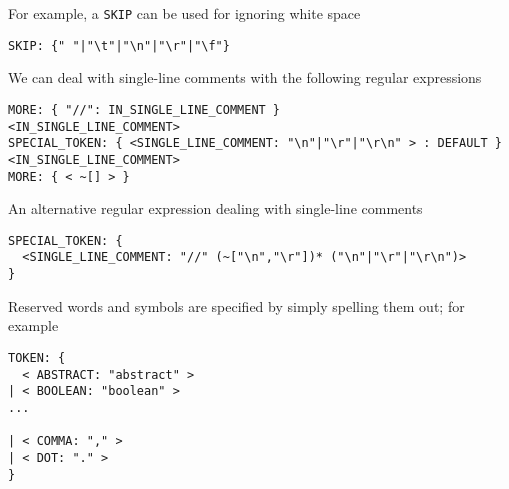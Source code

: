 \documentclass[8pt,a4paper,compress]{beamer}
\begin{document}
\begin{frame}[fragile]
\pause

For example, a \lstinline{SKIP} can be used for ignoring white space
\begin{lstlisting}[language={}]
SKIP: {" "|"\t"|"\n"|"\r"|"\f"}
\end{lstlisting}

\pause
\bigskip

We can deal with single-line comments with the following regular expressions

\begin{lstlisting}
MORE: { "//": IN_SINGLE_LINE_COMMENT }
<IN_SINGLE_LINE_COMMENT>
SPECIAL_TOKEN: { <SINGLE_LINE_COMMENT: "\n"|"\r"|"\r\n" > : DEFAULT }
<IN_SINGLE_LINE_COMMENT>
MORE: { < ~[] > }
\end{lstlisting}

\pause
\bigskip

An alternative regular expression dealing with single-line comments

\begin{lstlisting}
SPECIAL_TOKEN: {
  <SINGLE_LINE_COMMENT: "//" (~["\n","\r"])* ("\n"|"\r"|"\r\n")>
}
\end{lstlisting}

\pause
\bigskip

Reserved words and symbols are specified by simply spelling them out; for example

\begin{lstlisting}
TOKEN: {
  < ABSTRACT: "abstract" >
| < BOOLEAN: "boolean" >
...

| < COMMA: "," >
| < DOT: "." >
}
\end{lstlisting}
\end{frame}
\end{document}
